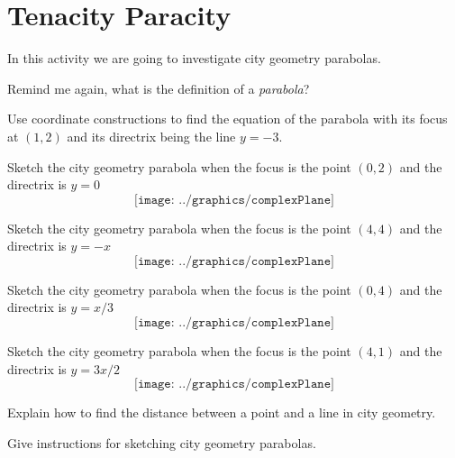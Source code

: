 \newpage
\section{Tenacity Paracity}
                                  

In this activity we are going to investigate city geometry parabolas.

\begin{prob} 
Remind me again, what is the definition of a \textit{parabola}?
\end{prob}

\begin{prob}
Use coordinate constructions to find the equation of
the parabola with its focus at $(1,2)$ and its directrix being the line $y=-3$.
\end{prob}



\begin{prob}
Sketch the city geometry parabola when the focus is the point $(0,2)$
and the directrix is $y=0$
\[
\texttt{[image: ../graphics/complexPlane]}
\]
\end{prob}

\break

\begin{prob}
Sketch the city geometry parabola when the focus is the point $(4,4)$
and the directrix is $y=-x$
\[
\texttt{[image: ../graphics/complexPlane]}
\]
\end{prob}

\break

\begin{prob}
Sketch the city geometry parabola when the focus is the point $(0,4)$
and the directrix is $y=x/3$
\[
\texttt{[image: ../graphics/complexPlane]}
\]
\end{prob}

\break

\begin{prob}
Sketch the city geometry parabola when the focus is the point $(4,1)$
and the directrix is $y=3x/2$
\[
\texttt{[image: ../graphics/complexPlane]}
\]
\end{prob}

\begin{prob}
Explain how to find the distance between a point and a line in city
geometry.
\end{prob}


\begin{prob}
Give instructions for sketching city geometry parabolas.
\end{prob}


